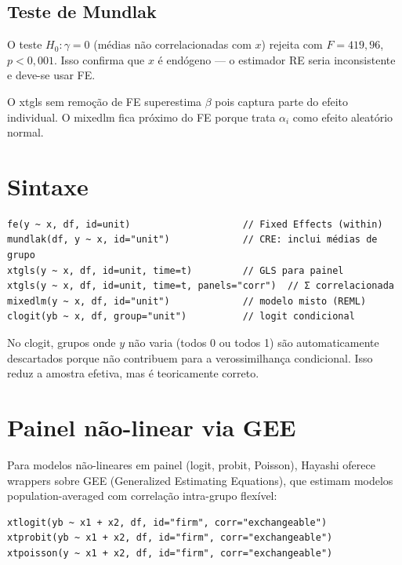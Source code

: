 \subsection*{Teste de Mundlak}

O teste $H_0: \gamma = 0$ (médias não correlacionadas com $x$) rejeita com
$F = 419{,}96$, $p < 0{,}001$. Isso confirma que $x$ é endógeno — o estimador
RE seria inconsistente e deve-se usar FE.

O xtgls sem remoção de FE superestima $\beta$ pois captura parte do efeito
individual. O mixedlm fica próximo do FE porque trata $\alpha_i$ como efeito
aleatório normal.

\section{Sintaxe}

\begin{lstlisting}
fe(y ~ x, df, id=unit)                    // Fixed Effects (within)
mundlak(df, y ~ x, id="unit")             // CRE: inclui médias de grupo
xtgls(y ~ x, df, id=unit, time=t)         // GLS para painel
xtgls(y ~ x, df, id=unit, time=t, panels="corr")  // Σ correlacionada
mixedlm(y ~ x, df, id="unit")             // modelo misto (REML)
clogit(yb ~ x, df, group="unit")          // logit condicional
\end{lstlisting}

\begin{nota}
  No clogit, grupos onde $y$ não varia (todos 0 ou todos 1) são
  automaticamente descartados porque não contribuem para a verossimilhança
  condicional. Isso reduz a amostra efetiva, mas é teoricamente correto.
\end{nota}

\section{Painel não-linear via GEE}


Para modelos não-lineares em painel (logit, probit, Poisson), Hayashi
oferece wrappers sobre GEE (Generalized Estimating Equations), que
estimam modelos population-averaged com correlação intra-grupo
flexível:

\begin{lstlisting}
xtlogit(yb ~ x1 + x2, df, id="firm", corr="exchangeable")
xtprobit(yb ~ x1 + x2, df, id="firm", corr="exchangeable")
xtpoisson(y ~ x1 + x2, df, id="firm", corr="exchangeable")
\end{lstlisting}

